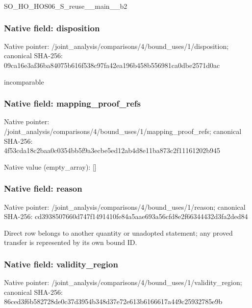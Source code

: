 \documentclass[10pt,a4paper]{article}
\begin{document}
\begingroup\raggedright\sloppy SO\_\allowbreak{}HO\_\allowbreak{}HOS06\_\allowbreak{}S\_\allowbreak{}reuse\_\allowbreak{}\_\allowbreak{}main\_\allowbreak{}\_\allowbreak{}b2\par\endgroup

\subsubsection{Native field: disposition}
Native pointer: /joint\_\allowbreak{}analysis/comparisons/4/bound\_\allowbreak{}uses/1/disposition; canonical SHA-256: 09ca16e3af36ba84075b616f538c97fa42ea196b458b556981ca0dbe2571d0ac

\begingroup\raggedright\sloppy incomparable\par\endgroup

\subsubsection{Native field: mapping\_\allowbreak{}proof\_\allowbreak{}refs}
Native pointer: /joint\_\allowbreak{}analysis/comparisons/4/bound\_\allowbreak{}uses/1/mapping\_\allowbreak{}proof\_\allowbreak{}refs; canonical SHA-256: 4f53cda18c2baa0c0354bb5f9a3ecbe5ed12ab4d8e11ba873c2f11161202b945

Native value (empty\_\allowbreak{}array): []

\subsubsection{Native field: reason}
Native pointer: /joint\_\allowbreak{}analysis/comparisons/4/bound\_\allowbreak{}uses/1/reason; canonical SHA-256: cd3938507660d747f1491410fe84a5aae693a56cfd8e2f66344432d3fa2ded84

\begingroup\raggedright\sloppy Direct row belongs to another quantity or unadopted statement;\allowbreak{} any proved transfer is represented by its own bound ID.\par\endgroup

\subsubsection{Native field: validity\_\allowbreak{}region}
Native pointer: /joint\_\allowbreak{}analysis/comparisons/4/bound\_\allowbreak{}uses/1/validity\_\allowbreak{}region; canonical SHA-256: 86ced3f6b582728de0c37d3954b348d37e72e613b6166617a449c25932785e9b
\end{document}
